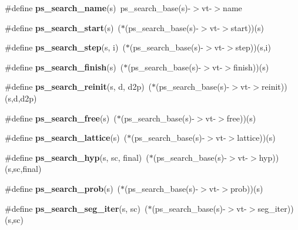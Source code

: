 \begin{DoxyCompactItemize}
\item 
\#define {\bfseries ps\-\_\-search\-\_\-name}(s)~ps\-\_\-search\-\_\-base(s)-\/$>$vt-\/$>$name\label{pocketsphinx__internal_8h_a6ff1216eb4c0053ecdfe6096d79f02f7}

\item 
\#define {\bfseries ps\-\_\-search\-\_\-start}(s)~($\ast$(ps\-\_\-search\-\_\-base(s)-\/$>$vt-\/$>$start))(s)\label{pocketsphinx__internal_8h_ac905db8dfa65727e787c44f40d80239c}

\item 
\#define {\bfseries ps\-\_\-search\-\_\-step}(s, i)~($\ast$(ps\-\_\-search\-\_\-base(s)-\/$>$vt-\/$>$step))(s,i)\label{pocketsphinx__internal_8h_a3e3be8540f1e419fe4dfa1a063c4e8be}

\item 
\#define {\bfseries ps\-\_\-search\-\_\-finish}(s)~($\ast$(ps\-\_\-search\-\_\-base(s)-\/$>$vt-\/$>$finish))(s)\label{pocketsphinx__internal_8h_a52d4cf988efa2211c86a2168de346032}

\item 
\#define {\bfseries ps\-\_\-search\-\_\-reinit}(s, d, d2p)~($\ast$(ps\-\_\-search\-\_\-base(s)-\/$>$vt-\/$>$reinit))(s,d,d2p)\label{pocketsphinx__internal_8h_a071483ece6369091cc50334f5be1124b}

\item 
\#define {\bfseries ps\-\_\-search\-\_\-free}(s)~($\ast$(ps\-\_\-search\-\_\-base(s)-\/$>$vt-\/$>$free))(s)\label{pocketsphinx__internal_8h_ac5475853d99524bb4c933c42df58118b}

\item 
\#define {\bfseries ps\-\_\-search\-\_\-lattice}(s)~($\ast$(ps\-\_\-search\-\_\-base(s)-\/$>$vt-\/$>$lattice))(s)\label{pocketsphinx__internal_8h_ac821fb65e0c2ef778a4b8b49ecf30e11}

\item 
\#define {\bfseries ps\-\_\-search\-\_\-hyp}(s, sc, final)~($\ast$(ps\-\_\-search\-\_\-base(s)-\/$>$vt-\/$>$hyp))(s,sc,final)\label{pocketsphinx__internal_8h_a61247136ccf60cf65c19ecc9efebcb73}

\item 
\#define {\bfseries ps\-\_\-search\-\_\-prob}(s)~($\ast$(ps\-\_\-search\-\_\-base(s)-\/$>$vt-\/$>$prob))(s)\label{pocketsphinx__internal_8h_a3fb9e1a2036effd2f15cd088140c750f}

\item 
\#define {\bfseries ps\-\_\-search\-\_\-seg\-\_\-iter}(s, sc)~($\ast$(ps\-\_\-search\-\_\-base(s)-\/$>$vt-\/$>$seg\-\_\-iter))(s,sc)\label{pocketsphinx__internal_8h_a6478039ec1ab5948ff19123c4464a5a4}


\end{DoxyCompactItemize}
